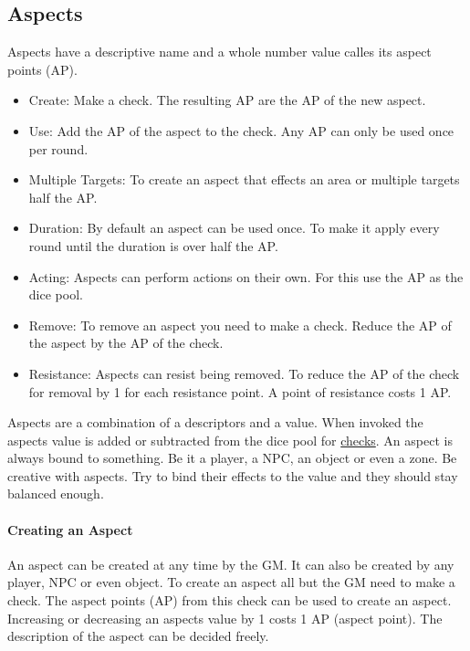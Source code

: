 \documentclass[11pt]{article}
\begin{document}
{\subsection{Aspects}
\label{sec:org652ad55}
\begin{short}
Aspects have a descriptive name and a whole number value calles its aspect points (AP).
\begin{itemize}
\item Create: Make a check. The resulting AP are the AP of the new aspect.
\item Use: Add the AP of the aspect to the check. Any AP can only be used once per round.
\item Multiple Targets: To create an aspect that effects an area or multiple targets half the AP.
\item Duration: By default an aspect can be used once. To make it apply every round until the duration is over half the AP.
\item Acting: Aspects can perform actions on their own. For this use the AP as the dice pool.
\item Remove: To remove an aspect you need to make a check. Reduce the AP of the aspect by the AP of the check.
\item Resistance: Aspects can resist being removed. To reduce the AP of the check for removal by 1 for each resistance point. A point of resistance costs 1 AP.
\end{itemize}
\end{short}


Aspects are a combination of a descriptors and a value. When invoked the aspects value is added or subtracted from the dice pool  for \hyperref[sec:org12da81f]{checks}. An aspect is always bound to something. Be it a player, a NPC, an object or even a zone. Be creative with aspects. Try to bind their effects to the value and they should stay balanced enough.

\paragraph*{Creating an Aspect}
\label{sec:org359351c}

An aspect can be created at any time by the GM. It can also be created by any player, NPC or even object. To create an aspect all but the GM need to make a check. The aspect points (AP) from this check can be used to create an aspect. Increasing or decreasing an aspects value by 1 costs 1 AP (aspect point). The description of the aspect can be decided freely. 

}
\end{document}
